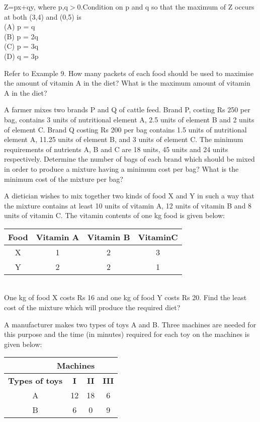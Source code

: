 Z=px+qy, where p,q$>$0.Condition on p and q so that the maximum of Z
occurs at both (3,4) and (0,5) is\\
(A) p = q\\
(B) p = 2q\\
(C) p = 3q\\
(D) q = 3p\\
\item Refer to Example 9. How many packets of each food should be used to maximise
the amount of vitamin A in the diet? What is the maximum amount of vitamin A
in the diet?\\
\item A farmer mixes two brands P and Q of cattle feed. Brand P, costing Rs 250 per
bag, contains 3 units of nutritional element A, 2.5 units of element B and 2 units
of element C. Brand Q costing Rs 200 per bag contains 1.5 units of nutritional
element A, 11.25 units of element B, and 3 units of element C. The minimum
requirements of nutrients A, B and C are 18 units, 45 units and 24 units respectively.
Determine the number of bags of each brand which should be mixed in order to
produce a mixture having a minimum cost per bag? What is the minimum cost of
the mixture per bag?\\
\item A dietician wishes to mix together two kinds of food X and Y in such a way that
the mixture contains at least 10 units of vitamin A, 12 units of vitamin B and
8 units of vitamin C. The vitamin contents of one kg food is given below:\\
\begin{tabular}{|c|c|c|c|}
\hline
\textbf{Food} &\textbf{Vitamin A} &\textbf{Vitamin B} & \textbf{VitaminC}\\
\hline
X & 1 & 2 & 3\\
\hline
Y &2 &2 &1\\
\hline


\end{tabular}\\
One kg of food X costs Rs 16 and one kg of food Y costs Rs 20. Find the least
cost of the mixture which will produce the required diet?\\
\item A manufacturer makes two types of toys A and B. Three machines are needed
for this purpose and the time (in minutes) required for each toy on the machines
is given below:\\
\begin{tabular}{|c|c|c|c|}
\hline
 \multicolumn{3}{|r}{\textbf{ Machines}}& \\ \cline{2-4}
\hline
\textbf {Types of toys}&\textbf{I}&\textbf{II}&\textbf{III}\\
\hline
A&12&18&6\\
\hline
 B&6&0&9\\
 \hline 

\end{tabular}




